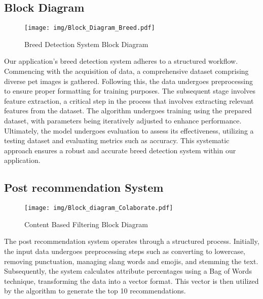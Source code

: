 \subsection{Block Diagram}
\vspace{1.5cm}
\begin{figure}[H]
\centering
\texttt{[image: img/Block\_Diagram\_Breed.pdf]}
\caption{Breed Detection System Block Diagram}
\label{fig:system-overview}
\end{figure}
Our application's breed detection system adheres to a structured workflow. Commencing with the acquisition of data, a comprehensive dataset comprising diverse pet images is gathered. Following this, the data undergoes preprocessing to ensure proper formatting for training purposes. The subsequent stage involves feature extraction, a critical step in the process that involves extracting relevant features from the dataset. The algorithm undergoes training using the prepared dataset, with parameters being iteratively adjusted to enhance performance. Ultimately, the model undergoes evaluation to assess its effectiveness, utilizing a testing dataset and evaluating metrics such as accuracy. This systematic approach ensures a robust and accurate breed detection system within our application.


\subsection{Post recommendation System}
\vspace{1.5cm}
\begin{figure}[H]
\centering
\texttt{[image: img/Block\_diagram\_Colaborate.pdf]}
\caption{Content Based Filtering Block Diagram}
\label{fig:system-overview}
\end{figure}
The post recommendation system operates through a structured process. Initially, the input data undergoes preprocessing steps such as converting to lowercase, removing punctuation, managing slang words and emojis, and stemming the text. Subsequently, the system calculates attribute percentages using a Bag of Words technique, transforming the data into a vector format. This vector is then utilized by the algorithm to generate the top 10 recommendations.



